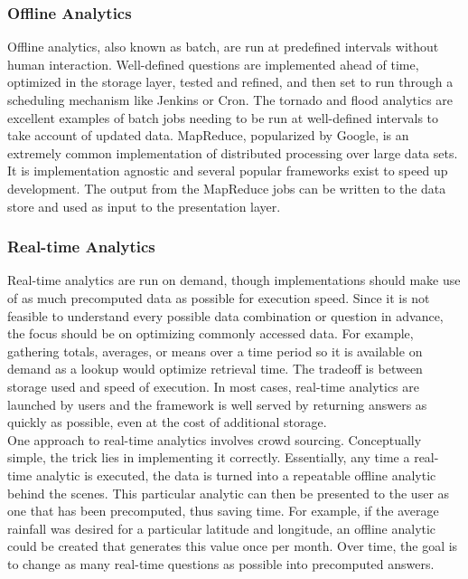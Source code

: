 \subsubsection{Offline Analytics}
Offline analytics, also known as batch, are run at predefined intervals without human interaction. Well-defined questions are implemented ahead of time, optimized in the storage layer, tested and refined, and then set to run through a scheduling mechanism like Jenkins or Cron. The tornado and flood analytics are excellent examples of batch jobs needing to be run at well-defined intervals to take account of updated data. MapReduce, popularized by Google, is an extremely common implementation of distributed processing over large data sets. It is implementation agnostic and several popular frameworks exist to speed up development. The output from the MapReduce jobs can be written to the data store and used as input to the presentation layer.
\subsubsection{Real-time Analytics}
Real-time analytics are run on demand, though implementations should make use of as much precomputed data as possible for execution speed. Since it is not feasible to understand every possible data combination or question in advance, the focus should be on optimizing commonly accessed data. For example, gathering totals, averages, or means over a time period so it is available on demand as a lookup would optimize retrieval time. The tradeoff is between storage used and speed of execution. In most cases, real-time analytics are launched by users and the framework is well served by returning answers as quickly as possible, even at the cost of additional storage.\\

One approach to real-time analytics involves crowd sourcing. Conceptually simple, the trick lies in implementing it correctly. Essentially, any time a real-time analytic is executed, the data is turned into a repeatable offline analytic behind the scenes. This particular analytic can then be presented to the user as one that has been precomputed, thus saving time. For example, if the average rainfall was desired for a particular latitude and longitude, an offline analytic could be created that generates this value once per month. Over time, the goal is to change as many real-time questions as possible into precomputed answers.
